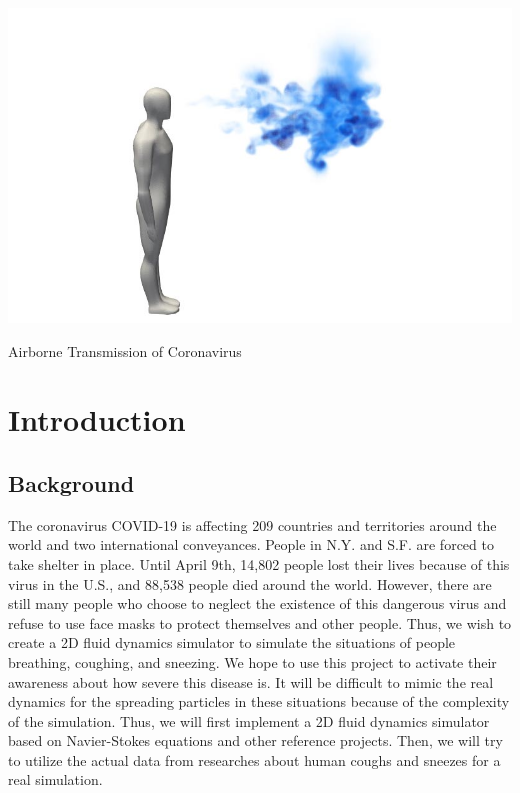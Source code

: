 \documentclass[sigconf]{acmart}
\begin{document}
\begin{teaserfigure}
  \includegraphics[width=\textwidth]{images/final.jpg}
  \caption{Airborne Transmission of Coronavirus\cite{figcite1}}
  \label{fig:teaser}
\end{teaserfigure}

\maketitle

\section{Introduction}
\subsection{Background}
The coronavirus COVID-19 is affecting 209 countries and territories around the world and two international conveyances. People in N.Y. and S.F. are forced to take shelter in place. Until April 9th, 14,802 people lost their lives because of this virus in the U.S., and 88,538 people died around the world. However, there are still many people who choose to neglect the existence of this dangerous virus and refuse to use face masks to protect themselves and other people. Thus, we wish to create a 2D fluid dynamics simulator to simulate the situations of people breathing, coughing, and sneezing. We hope to use this project to activate their awareness about how severe this disease is. It will be difficult to mimic the real dynamics for the spreading particles in these situations because of the complexity of the simulation. Thus, we will first implement a 2D fluid dynamics simulator based on Navier-Stokes equations and other reference projects. Then, we will try to utilize the actual data from researches about human coughs and sneezes for a real simulation.
\end{document}
